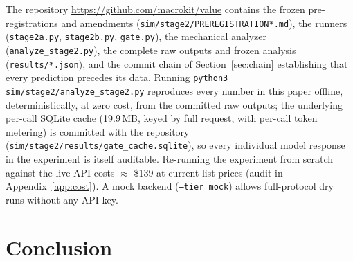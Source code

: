\documentclass{article} %
\newif\ifanon
\begin{document}
\ifanon
The anonymized supplementary material accompanying this submission contains the frozen pre-registrations and amendments (\texttt{sim/stage2/PREREGISTRATION*.md}), the runners (\texttt{stage2a.py}, \texttt{stage2b.py}, \texttt{gate.py}), the mechanical analyzer (\texttt{analyze\_stage2.py}), the complete raw outputs and frozen analysis (\texttt{results/*.json}), and the pre-registration commit chain of Section~\ref{sec:chain} establishing that every prediction precedes its data. Running \texttt{python3 sim/stage2/analyze\_stage2.py} on the included files reproduces every number in this paper offline, deterministically, at zero cost; the underlying per-call SQLite cache (19.9\,MB uncompressed, keyed by full request, with per-call token metering) is included in the supplement (\texttt{sim/stage2/results/gate\_cache.sqlite}), so every individual model response in the experiment is itself auditable by the reviewer. Re-running the experiment from scratch against the live API costs $\approx$ \$139 at current list prices (audit in Appendix~\ref{app:cost}). A mock backend (\texttt{--tier mock}) allows full-protocol dry runs without any API key.
\else
The repository \url{https://github.com/macrokit/value} contains the frozen pre-registrations and amendments (\texttt{sim/stage2/PREREGISTRATION*.md}), the runners (\texttt{stage2a.py}, \texttt{stage2b.py}, \texttt{gate.py}), the mechanical analyzer (\texttt{analyze\_stage2.py}), the complete raw outputs and frozen analysis (\texttt{results/*.json}), and the commit chain of Section~\ref{sec:chain} establishing that every prediction precedes its data. Running \texttt{python3 sim/stage2/analyze\_stage2.py} reproduces every number in this paper offline, deterministically, at zero cost, from the committed raw outputs; the underlying per-call SQLite cache (19.9\,MB, keyed by full request, with per-call token metering) is committed with the repository (\texttt{sim/stage2/results/gate\_cache.sqlite}), so every individual model response in the experiment is itself auditable. Re-running the experiment from scratch against the live API costs $\approx$ \$139 at current list prices (audit in Appendix~\ref{app:cost}). A mock backend (\texttt{--tier mock}) allows full-protocol dry runs without any API key.
\fi

\section{Conclusion}
\end{document}
